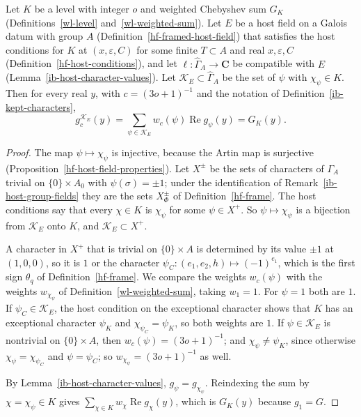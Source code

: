 \begin{proposition}\label{ib-level-sum-host-characters}
Let $K$ be a level with integer $o$ and weighted Chebyshev sum $G_K$
(Definitions~\ref{wl-level} and~\ref{wl-weighted-sum}). Let $E$ be a host field
on a Galois datum with group $A$ (Definition~\ref{hf-framed-host-field}) that
satisfies the host conditions for $K$ at $(x,\varepsilon,C)$ for some finite
$T\subset A$ and real $x,\varepsilon,C$
(Definition~\ref{hf-host-conditions}), and let $\ell:\widehat\Gamma_A\to\mathbf C$
be compatible with $E$ (Lemma~\ref{ib-host-character-values}). Let
$\mathcal K_E\subset\widehat\Gamma_A$ be the set of $\psi$ with $\chi_\psi\in K$.
Then for every real $y$, with $c=(3o+1)^{-1}$ and the notation of
Definition~\ref{ib-kept-characters},
\[
 g^{\mathcal K_E}_c(y)=\sum_{\psi\in\mathcal K_E}w_c(\psi)\operatorname{Re}g_\psi(y)=G_K(y).
\]
\end{proposition}
\begin{proof}
The map $\psi\mapsto\chi_\psi$ is injective, because the Artin map is surjective
(Proposition~\ref{hf-host-field-properties}).
Let $X^\pm$ be the sets of characters of $\Gamma_A$ trivial on $\{0\}\times A_0$
with $\psi(\sigma)=\pm1$; under the identification of
Remark~\ref{ib-host-group-fields} they are the sets $X^\pm_\Phi$ of
Definition~\ref{hf-frame}. The host conditions say that every $\chi\in K$ is
$\chi_\psi$ for some $\psi\in X^+$.
So $\psi\mapsto\chi_\psi$ is a bijection from $\mathcal K_E$ onto $K$, and
$\mathcal K_E\subset X^+$.

A character in $X^+$ that is trivial on $\{0\}\times A$ is determined by its value
$\pm1$ at $(1,0,0)$, so it is $1$ or the character
$\psi_C:(e_1,e_2,h)\mapsto(-1)^{e_1}$, which is the first sign $\theta_q$ of
Definition~\ref{hf-frame}. We compare the weights $w_c(\psi)$ with the
weights $w_{\chi_\psi}$ of Definition~\ref{wl-weighted-sum}, taking $w_1=1$. For
$\psi=1$ both are $1$. If $\psi_C\in\mathcal K_E$, the host condition on the
exceptional character shows that $K$ has an exceptional character $\psi_K$ and
$\chi_{\psi_C}=\psi_K$, so both weights are $1$. If $\psi\in\mathcal K_E$ is
nontrivial on $\{0\}\times A$, then $w_c(\psi)=(3o+1)^{-1}$; and
$\chi_\psi\neq\psi_K$, since otherwise $\chi_\psi=\chi_{\psi_C}$ and
$\psi=\psi_C$; so $w_{\chi_\psi}=(3o+1)^{-1}$ as well.

By Lemma~\ref{ib-host-character-values}, $g_\psi=g_{\chi_\psi}$. Reindexing the
sum by $\chi=\chi_\psi\in K$ gives $\sum_{\chi\in K}w_\chi\operatorname{Re}g_\chi(y)$,
which is $G_K(y)$ because $g_1=G$.
\end{proof}

